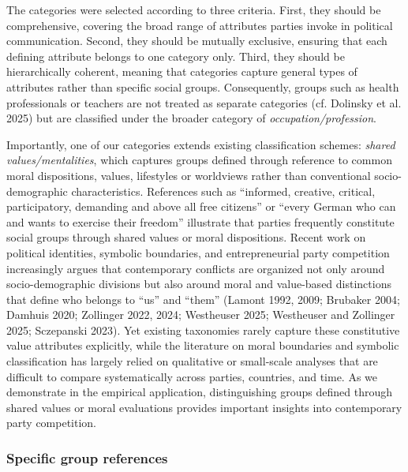 \documentclass[12pt]{article}
\begin{document}
The categories were selected according to three criteria.
First, they should be comprehensive, covering the broad range of attributes parties invoke in political communication.
Second, they should be mutually exclusive, ensuring that each defining attribute belongs to one category only.
Third, they should be hierarchically coherent, meaning that categories capture general types of attributes rather than specific social groups.
Consequently, groups such as health professionals or teachers are not treated as separate categories (cf. Dolinsky et al. 2025) but are classified under the broader category of \emph{occupation/profession}.

Importantly, one of our categories extends existing classification schemes: \emph{shared values/mentalities}, which captures groups defined through reference to common moral dispositions, values, lifestyles or worldviews rather than conventional socio-demographic characteristics.
References such as ``informed, creative, critical, participatory, demanding and above all free citizens'' or ``every German who can and wants to exercise their freedom'' illustrate that parties frequently constitute social groups through shared values or moral dispositions.
Recent work on political identities, symbolic boundaries, and entrepreneurial party competition increasingly argues that contemporary conflicts are organized not only around socio-demographic divisions but also around moral and value-based distinctions that define who belongs to ``us'' and ``them'' (Lamont 1992, 2009; Brubaker 2004; Damhuis 2020; Zollinger 2022, 2024; Westheuser 2025; Westheuser and Zollinger 2025; Sczepanski 2023).
Yet existing taxonomies rarely capture these constitutive value attributes explicitly, while the literature on moral boundaries and symbolic classification has largely relied on qualitative or small-scale analyses that are difficult to compare systematically across parties, countries, and time.
As we demonstrate in the empirical application, distinguishing groups defined through shared values or moral evaluations provides important insights into contemporary party competition.

\subsubsection{Specific group references}\label{specific-group-references}
\end{document}
